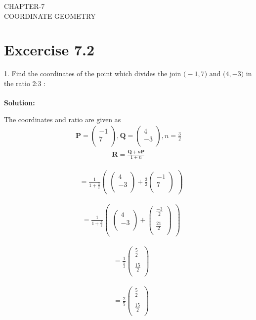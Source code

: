 \documentclass[12pt]{article}
\newcommand{\solution}{\noindent \textbf{Solution: }}
\newcommand{\myvec}[1]{\ensuremath{\begin{pmatrix}#1\end{pmatrix}}}
\let\vec\mathbf
\begin{document}
\begin{center}
\textbf\large{CHAPTER-7 \\ COORDINATE GEOMETRY}
\end{center}
\section*{Excercise 7.2}

1. Find the coordinates of the point which divides the join $\vec(-1,7) \text{ and } \vec(4,-3)$ in the ratio 2:3 :
\\
\\
\solution		

 The coordinates and ratio are given as
\begin{align}
\vec{P} = \myvec{
-1\\
7\\
},
\vec{Q} = \myvec{
4\\
-3\\
},  n=\frac{3}{2}
\end{align}
\begin{align}
	\vec{R}=\frac{\vec{Q}+n\vec{P}}{1+n}
\end{align}


\begin{align}
	&=   \frac{1}{1+\frac{3}{2}}  \myvec{\myvec{
4\\
-3\\
}
  +
   \frac{3}{2}\myvec{
-1\\
7\\
}}
\end{align}

\begin{align}
	&= \frac{1}{1+\frac{3}{2}} \myvec{\myvec{
4\\
-3\\
}
  +
  \myvec{
	  \frac{-3}{2}\\
	  \\
	\frac{21}{2}\\
}} 
\end{align}

\begin{align}
	&=\frac{1}{\frac{5}{2}} 
	\myvec{
	\frac{5}{2}\\
	\\
	\frac{15}{2}\\
}
\end{align}

\begin{align}
	&=\frac{2}{5}
        \myvec{
          \frac{5}{2}\\
	  \\
	\frac{15}{2}\\
  }
  \end{align}
\end{document}
